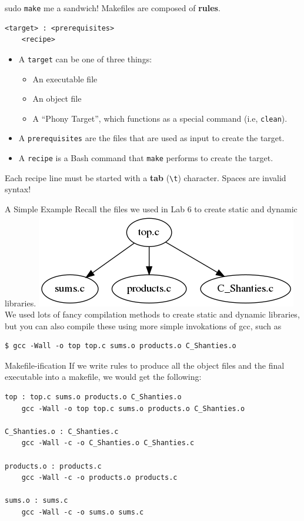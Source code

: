 \documentclass[11pt]{beamer}
\begin{document}
\begin{frame}[fragile=singleslide]{sudo \texttt{make} me a sandwich!}
Makefiles are composed of \textbf{rules}.
\begin{lstlisting}[style=terminal]
<target> : <prerequisites>
	<recipe>
\end{lstlisting}
\begin{itemize}
\item A \texttt{target} can be one of three things:
\begin{itemize}
\item An executable file
\item An object file
\item A ``Phony Target'', which functions as a special command (i.e, \texttt{clean}). 
\end{itemize}
\item A \texttt{prerequisites} are the files that are used as input to create the target.  
\item A \texttt{recipe} is a Bash command that \texttt{make} performs to create the target.  
\end{itemize}
Each recipe line must be started with a \textbf{tab} (\texttt{\textbackslash t}) character.  Spaces are invalid syntax!
\end{frame}

\begin{frame}[fragile=singleslide]{A Simple Example}
Recall the files we used in Lab 6 to create static and dynamic libraries.  
\center
\includegraphics[scale=0.5]{graphs/filegraph.png} \\
\flushleft
We used lots of fancy compilation methods to create static and dynamic libraries, but you can also compile these using more simple invokations of gcc, such as 
\begin{lstlisting}[style=terminal]
$ gcc -Wall -o top top.c sums.o products.o C_Shanties.o
\end{lstlisting}
\end{frame}

\begin{frame}[fragile=singleslide]{Makefile-ification}
If we write rules to produce all the object files and the final executable into a makefile, we would get the following: 
\begin{lstlisting}[style=terminal]
top : top.c sums.o products.o C_Shanties.o 
	gcc -Wall -o top top.c sums.o products.o C_Shanties.o

C_Shanties.o : C_Shanties.c
	gcc -Wall -c -o C_Shanties.o C_Shanties.c

products.o : products.c
	gcc -Wall -c -o products.o products.c

sums.o : sums.c
	gcc -Wall -c -o sums.o sums.c
\end{lstlisting}
\end{frame}
\end{document}
